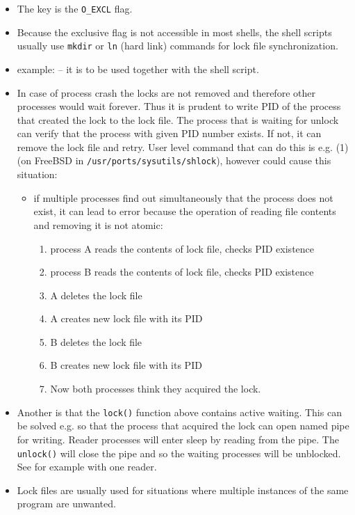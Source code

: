 \begin{itemize}
\item \label{LOCK_UNLOCK} The key is the \texttt{O\_EXCL} flag.
\item Because the exclusive flag is not accessible in most shells, the shell
scripts usually use \texttt{mkdir} or \texttt{ln} (hard link) commands for
lock file synchronization.
\item example:  -- it is to be used together
with the  shell script.
\item In case of process crash the locks are not removed and therefore other
processes would wait forever. Thus it is prudent to write PID of the process
that created the lock to the lock file. The process that is waiting for unlock
can verify that the process with given PID number exists. If not, it can remove
the lock file and retry. User level command that can do this is e.g.
(1) (on FreeBSD in \texttt{/usr/ports/sysutils/shlock}),
however could cause this situation:
\begin{itemize}
\item {} if multiple processes find out simultaneously that
the process does not exist, it can lead to error because the operation of
reading file contents and removing it is not atomic:
\begin{enumerate}
\item process A reads the contents of lock file, checks PID existence
\item process B reads the contents of lock file, checks PID existence
\item A deletes the lock file
\item A creates new lock file with its PID
\item B deletes the lock file
\item B creates new lock file with its PID
\item Now both processes think they acquired the lock.
\end{enumerate}
\end{itemize}
\item Another  is that the \texttt{lock()} function above contains
active waiting.
This can be solved e.g. so that the process that acquired the lock can open
named pipe for writing. Reader processes will enter sleep by reading from the
pipe.
The \texttt{unlock()} will close the pipe and so the waiting processes will
be unblocked. See  for example with one reader.
\item Lock files are usually used for situations where multiple instances of
the same program are unwanted.
\end{itemize}

